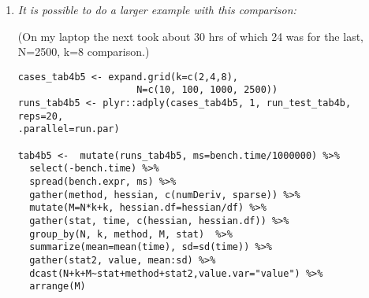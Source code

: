 \documentclass{article}
\newenvironment{revQuote}{\itshape}{\vspace{\baselineskip}}
\newenvironment{response}{\normalfont}{\vspace{\baselineskip}}
\begin{document}
\begin{enumerate}
\begin{revQuote}
\begin{verbatim}
\end{verbatim}


  \end{revQuote}
  
  \begin{response}
    
  \end{response}

\item\begin{revQuote}
It is possible to do a larger example with this comparison:

(On my laptop the next took about 30 hrs of which 24 was for the last,
N=2500, k=8 comparison.)
\begin{verbatim}
cases_tab4b5 <- expand.grid(k=c(2,4,8),
                     N=c(10, 100, 1000, 2500))
runs_tab4b5 <- plyr::adply(cases_tab4b5, 1, run_test_tab4b, reps=20,
.parallel=run.par)

tab4b5 <-  mutate(runs_tab4b5, ms=bench.time/1000000) %>%
  select(-bench.time) %>%
  spread(bench.expr, ms) %>%
  gather(method, hessian, c(numDeriv, sparse)) %>%
  mutate(M=N*k+k, hessian.df=hessian/df) %>%
  gather(stat, time, c(hessian, hessian.df)) %>%
  group_by(N, k, method, M, stat)  %>%
  summarize(mean=mean(time), sd=sd(time)) %>%
  gather(stat2, value, mean:sd) %>%
  dcast(N+k+M~stat+method+stat2,value.var="value") %>%
  arrange(M)


\end{verbatim}
\end{revQuote}
\end{enumerate}
\end{document}
